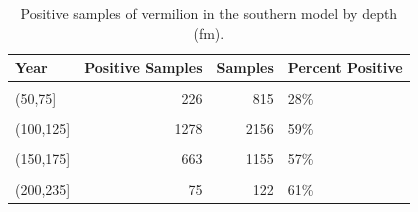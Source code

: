 \documentclass[
  english,
  a4paper,
]{article}
\begin{document}
\begin{table}

\caption{\label{tab:tab-depth-nwfschl}Positive samples of vermilion in the southern model by depth (fm).}
\centering
\begin{tabular}[t]{lrrl}
\toprule
Year & Positive Samples & Samples & Percent Positive\\
\midrule
\cellcolor{gray!6}{(0,50]} & \cellcolor{gray!6}{85} & \cellcolor{gray!6}{295} & \cellcolor{gray!6}{29\%}\\
(50,75] & 226 & 815 & 28\%\\
\cellcolor{gray!6}{(75,100]} & \cellcolor{gray!6}{1697} & \cellcolor{gray!6}{3847} & \cellcolor{gray!6}{44\%}\\
(100,125] & 1278 & 2156 & 59\%\\
\cellcolor{gray!6}{(125,150]} & \cellcolor{gray!6}{917} & \cellcolor{gray!6}{1594} & \cellcolor{gray!6}{58\%}\\
\addlinespace
(150,175] & 663 & 1155 & 57\%\\
\cellcolor{gray!6}{(175,200]} & \cellcolor{gray!6}{234} & \cellcolor{gray!6}{456} & \cellcolor{gray!6}{51\%}\\
(200,235] & 75 & 122 & 61\%\\
\bottomrule
\end{tabular}
\end{table}
\end{document}
